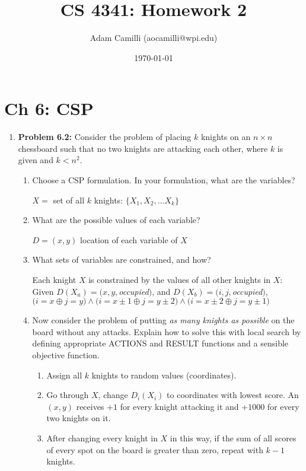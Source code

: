 \documentclass[10pt]{article}
\begin{document}
\title{CS 4341: Homework 2}
\author{Adam Camilli (aocamilli@wpi.edu)}
\date{\today}
\maketitle

\section*{Ch 6: CSP}
\begin{enumerate}
\item \textbf{Problem 6.2:} Consider the problem of placing $k$ knights on an $n \times n$ chessboard such that no two knights are attacking each other, where $k$ is given and $k < n^2$.
  \begin{enumerate}
  \item Choose a CSP formulation. In your formulation, what are the variables? 
    \begin{center}
      $X = $ set of all $k$ knights: $\{X_1, X_2, \ldots X_k\}$
    \end{center}
  \item What are the possible values of each variable?
    \begin{center}
      $D = (x,y) $ location of each variable of $X$
    \end{center}
  \item What sets of variables are constrained, and how?
    \begin{center}
      Each knight $X$ is constrained by the values of all other knights in $X$: \\
      Given $D(X_a) = (x,y,$\textit{occupied}$)$, and $D(X_b) = (i,j,$\textit{occupied}$)$, \\
      $\bigg( i = x \oplus j = y \bigg) \wedge \bigg( i = x \pm 1 \oplus j = y \pm 2 \bigg) \wedge \bigg( i = x \pm 2 \oplus j = y \pm 1 \bigg)$ 
      
    \end{center}
  \item Now consider the problem of putting \textit{as many knights as possible} on the board without any attacks. Explain how to solve this with local search by defining appropriate ACTIONS and RESULT functions and a sensible objective function. 
    \begin{center}
      \begin{enumerate}
      \item Assign all $k$ knights to random values (coordinates).
      \item Go through $X$, change $D_i(X_i)$ to coordinates with lowest score. An $(x,y)$ receives +$1$ for every knight attacking it and +$1000$ for every two knights on it.
      \item After changing every knight in $X$ in this way, if the sum of all scores of every spot on the board is greater than zero, repeat with $k-1$ knights.
      \end{enumerate}
    \end{center}
  \end{enumerate}


\end{enumerate}
\end{document}

